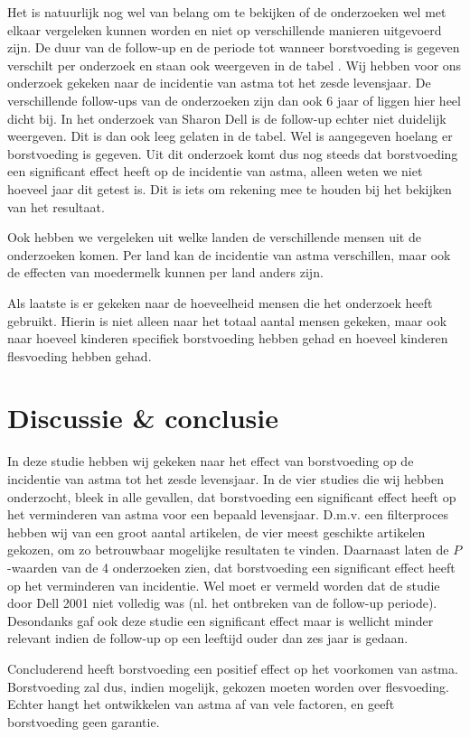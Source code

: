 \documentclass[abstract=true]{scrartcl}
\begin{document}
Het is natuurlijk nog wel van belang om te bekijken of de onderzoeken wel met elkaar vergeleken kunnen worden en niet op verschillende manieren uitgevoerd zijn. De duur van de follow-up en de periode tot wanneer borstvoeding is gegeven verschilt per onderzoek en staan ook weergeven in de tabel . Wij hebben voor ons onderzoek gekeken naar de incidentie van astma tot het zesde levensjaar. De verschillende follow-ups van de onderzoeken zijn dan ook 6 jaar of liggen hier heel dicht bij. In het onderzoek van Sharon Dell is de follow-up echter niet duidelijk weergeven. Dit is dan ook leeg gelaten in de tabel. Wel is aangegeven hoelang er borstvoeding is gegeven. Uit dit onderzoek komt dus nog steeds dat borstvoeding een significant effect heeft op de incidentie van astma, alleen weten we niet hoeveel jaar dit getest is. Dit is iets om rekening mee te houden bij het bekijken van het resultaat. 

Ook hebben we vergeleken uit welke landen de verschillende mensen uit de onderzoeken komen. Per land kan de incidentie van astma verschillen, maar ook de effecten van moedermelk kunnen per land anders zijn. 

Als laatste is er gekeken naar de hoeveelheid mensen die het onderzoek heeft gebruikt. Hierin is niet alleen naar het totaal aantal mensen gekeken, maar ook naar hoeveel kinderen specifiek borstvoeding hebben gehad en hoeveel kinderen flesvoeding hebben gehad. 

\section{Discussie \& conclusie}
In deze studie hebben wij gekeken naar het effect van borstvoeding op de incidentie van astma tot het zesde levensjaar. In de vier studies die wij hebben onderzocht, bleek in alle gevallen, dat borstvoeding een significant effect heeft op het verminderen van astma voor een bepaald levensjaar. 
D.m.v. een filterproces hebben wij van een groot aantal artikelen, de vier meest geschikte artikelen gekozen, om zo betrouwbaar mogelijke resultaten te vinden. Daarnaast laten de $P$-waarden van de 4 onderzoeken zien, dat borstvoeding een significant effect heeft op het verminderen van incidentie. 
Wel moet er vermeld worden dat de studie door Dell 2001 niet volledig was (nl. het ontbreken van de follow-up periode). Desondanks gaf ook deze studie een significant effect maar is wellicht minder relevant indien de follow-up op een leeftijd ouder dan zes jaar is gedaan. 

Concluderend heeft borstvoeding een positief effect op het voorkomen van astma. Borstvoeding zal dus, indien mogelijk, gekozen moeten worden over flesvoeding. Echter hangt het ontwikkelen van astma af van vele factoren, en geeft borstvoeding geen garantie. 
\end{document}
